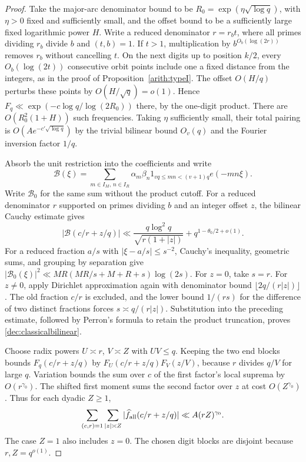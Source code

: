 \documentclass[11pt,a4paper]{article}
\theoremstyle{paperplain}
\numberwithin{equation}{section}
\begin{document}
\begin{proof}
Take the major-arc denominator bound to be
$R_0=\exp(\eta\sqrt{\log q})$, with $\eta>0$ fixed and sufficiently
small, and the offset bound to be a sufficiently large fixed
logarithmic power $H$.
Write a reduced denominator $r=r_b t$, where all primes dividing
$r_b$ divide $b$ and $(t,b)=1$. If $t>1$, multiplication by
$b^{O_b(\log(2r))}$ removes $r_b$ without cancelling $t$. On the next
digits up to position $k/2$, every $O_b(\log(2t))$ consecutive orbit
points include one a fixed distance from the integers, as in the proof
of Proposition~\ref{arith:typeI}. The offset $O(H/q)$ perturbs these
points by $O(H/\sqrt q)=o(1)$. Hence
$F_q\ll\exp(-c\log q/\log(2R_0))$ there, by the one-digit product.
There are $O(R_0^2(1+H))$ such frequencies. Taking $\eta$ sufficiently
small, their total pairing is $O(Ae^{-c'\sqrt{\log q}})$ by the trivial
bilinear bound $O_v(q)$ and the Fourier inversion factor $1/q$.

Absorb the unit restriction into the coefficients and write
\[
 \mathcal B(\xi)=\sum_{m\in I_M,\,n\in I_R}\alpha_m\beta_n
                 1_{vq\le mn<(v+1)q}e(-mn\xi).
\]
Write $\mathcal B_0$ for the same sum without the product cutoff.
For a reduced denominator $r$ supported on primes dividing $b$ and
an integer offset $z$, the bilinear Cauchy estimate gives
\begin{equation}\label{dec:classicalbilinear}
 |\mathcal B(c/r+z/q)|
 \ll\frac{q\log^2q}{\sqrt{r(1+|z|)}}+q^{1-\theta_0/2+o(1)}.
\end{equation}
For a reduced fraction $a/s$ with $|\xi-a/s|\le s^{-2}$, Cauchy's inequality,
geometric sums, and grouping by separation give
$|\mathcal B_0(\xi)|^2\ll MR(MR/s+M+R+s)\log(2s)$.
For $z=0$, take $s=r$.
For $z\ne0$, apply Dirichlet approximation again with denominator
bound $\lfloor2q/(r|z|)\rfloor$.
The old fraction $c/r$ is excluded, and the lower bound $1/(rs)$
for the difference of two distinct fractions forces
$s\asymp q/(r|z|)$.
Substitution into the preceding estimate, followed by Perron's
formula to retain the product truncation, proves
\eqref{dec:classicalbilinear}.

Choose radix powers $U\asymp r$, $V\asymp Z$ with $UV\le q$.
Keeping the two end blocks bounds $F_q(c/r+z/q)$ by
$F_U(c/r+z/q)F_V(z/V)$, because $r$ divides $q/V$ for large $q$.
Variation bounds the sum over $c$ of the first factor's local suprema
by $O(r^{\gamma_0})$. The shifted first moment sums the second factor
over $z$ at cost $O(Z^{\gamma_0})$. Thus for each dyadic $Z\ge1$,
\begin{equation}\label{dec:packlone}
 \sum_{(c,r)=1}\sum_{|z|\asymp Z}
 |\widehat f_{\rm all}(c/r+z/q)|\ll A(rZ)^{\gamma_0}.
\end{equation}
The case $Z=1$ also includes $z=0$.
The chosen digit blocks are disjoint because $r,Z=q^{o(1)}$.


\end{proof}
\end{document}
